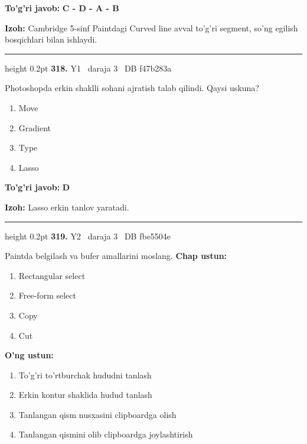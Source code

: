 \documentclass[10pt,a4paper,oneside]{article}
\begin{document}
\begin{tcolorbox}[enhanced,breakable,colback=teal!4,colframe=teal!45!black,boxrule=0.45pt,arc=1.2mm,left=2.8mm,right=2.8mm,top=2mm,bottom=2mm,before skip=2mm,after skip=2mm]
\textbf{\color{teal}To'g'ri javob:} \textbf{C - D - A - B}
\par\smallskip
\textbf{Izoh:} Cambridge 5-sinf Paintdagi Curved line avval to'g'ri segment, so'ng egilish bosqichlari bilan ishlaydi.
\end{tcolorbox}
\vspace{2mm}\hrule height 0.2pt \vspace{4mm}
\hypertarget{q318}{\textbf{\color{ink}318.}}  {\color{muted}\scriptsize Y1 \textbullet\ daraja 3 \textbullet\ DB f47b283a}
\par
Photoshopda erkin shaklli sohani ajratish talab qilindi. Qaysi uskuna?
\begin{enumerate}[label=\Alph*),leftmargin=9mm]
\item Move
\item Gradient
\item Type
\item Lasso
\end{enumerate}
\begin{tcolorbox}[enhanced,breakable,colback=teal!4,colframe=teal!45!black,boxrule=0.45pt,arc=1.2mm,left=2.8mm,right=2.8mm,top=2mm,bottom=2mm,before skip=2mm,after skip=2mm]
\textbf{\color{teal}To'g'ri javob:} \textbf{D}
\par\smallskip
\textbf{Izoh:} Lasso erkin tanlov yaratadi.
\end{tcolorbox}
\vspace{2mm}\hrule height 0.2pt \vspace{4mm}
\hypertarget{q319}{\textbf{\color{ink}319.}}  {\color{muted}\scriptsize Y2 \textbullet\ daraja 3 \textbullet\ DB fbe5504e}
\par
Paintda belgilash va bufer amallarini moslang.
\textbf{\footnotesize Chap ustun:}
\begin{enumerate}[label=\arabic*),leftmargin=9mm]
\item Rectangular select
\item Free-form select
\item Copy
\item Cut
\end{enumerate}
\textbf{\footnotesize O'ng ustun:}
\begin{enumerate}[label=\Alph*),leftmargin=9mm]
\item To'g'ri to'rtburchak hududni tanlash
\item Erkin kontur shaklida hudud tanlash
\item Tanlangan qism nusxasini clipboardga olish
\item Tanlangan qismini olib clipboardga joylashtirish
\end{enumerate}
\end{document}
